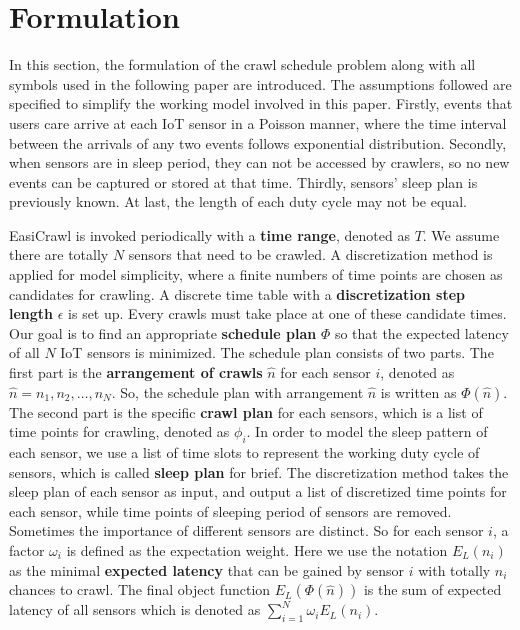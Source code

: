 \documentclass[conference]{IEEEtran}
\begin{document}
\section{Formulation}\label{formulation}

In this section, the formulation of the crawl schedule problem along with all symbols used in the following paper are introduced. 
The assumptions followed are specified to simplify the working model involved in this paper.
Firstly, events that users care arrive at each IoT sensor in a Poisson manner, where the time interval between the arrivals of any two events follows exponential distribution. 
Secondly, when sensors are in sleep period, they can not be accessed by crawlers, so no new events can be captured or stored at that time.
Thirdly, sensors' sleep plan is previously known.
At last, the length of each duty cycle may not be equal.

EasiCrawl is invoked periodically with a \textbf{time range}, denoted as $T$.
We assume there are totally $N$ sensors that need to be crawled.
A discretization method is applied for model simplicity, where a finite numbers of time points are chosen as candidates for crawling.
A discrete time table with a \textbf{discretization step length} $\epsilon$ is set up. Every crawls must take place at one of these candidate times.
Our goal is to find an appropriate \textbf{schedule plan} $\Phi$ so that the expected latency of all $N$ IoT sensors is minimized. 
The schedule plan consists of two parts. 
The first part is the \textbf{arrangement of crawls} $\hat{n}$ for each sensor $i$, denoted as $\hat{n}=n_1,n_2,\ldots,n_{N}$. 
So, the schedule plan with arrangement $\hat{n}$ is written as $\Phi(\hat{n})$.
The second part is the specific \textbf{crawl plan} for each sensors, which is a list of time points for crawling, denoted as $\phi_{i}$.
In order to model the sleep pattern of each sensor, we use a list of time slots to represent the working duty cycle of sensors, which is called \textbf{sleep plan} for brief. 
The discretization method takes the sleep plan of each sensor as input, and output a list of discretized time points for each sensor, while time points of sleeping period of sensors are removed.
Sometimes the importance of different sensors are distinct. So for each sensor $i$, a factor $\omega_i$ is defined as the expectation weight. 
Here we use the notation $E_{L}(n_{i})$ as the minimal \textbf{expected latency} that can be gained by sensor $i$ with totally $n_i$ chances to crawl.
The final object function $E_L(\Phi(\hat{n}))$ is the sum of expected latency of all sensors which is denoted as $\sum_{i=1}^{N} \omega_i E_{L}(n_{i})$.
\end{document}
